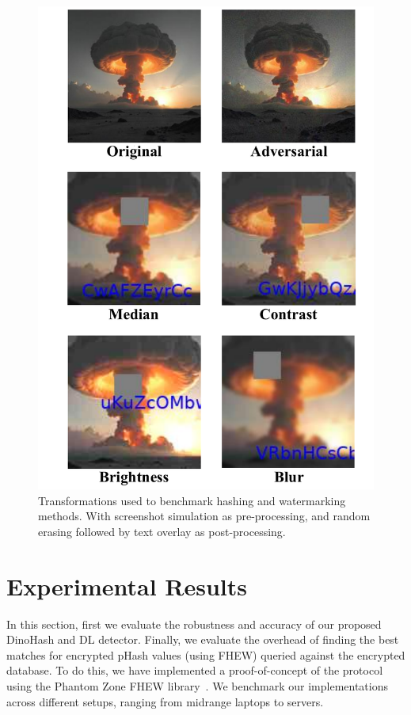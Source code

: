 \begin{figure}[!t]
    \vspace{-0.5cm}
    \centering
    \clearpage
    \includegraphics[page=1, width=\linewidth]{examples.pdf}
    \vspace{-0.5cm}
    \caption{Transformations used to benchmark hashing and watermarking methods. With screenshot simulation as pre-processing, and random erasing followed by text overlay as post-processing.}
    \label{fig:examples}
    \vspace{-0.5cm}
\end{figure}

\section{Experimental Results}
In this section, first we evaluate the robustness and accuracy of our proposed DinoHash and DL detector. Finally, we evaluate the overhead of finding the best matches for encrypted pHash values (using FHEW) queried against the encrypted database. To do this, we have implemented a proof-of-concept of the protocol using the Phantom Zone FHEW library~\cite{PhantomZone}. We benchmark our implementations across different setups, ranging from midrange laptops to servers.

